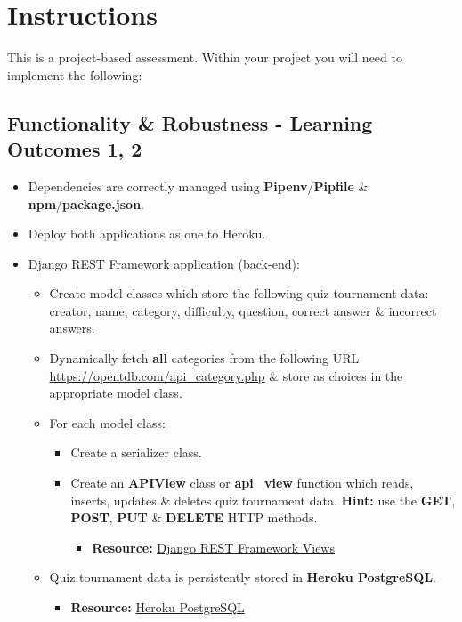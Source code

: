 \documentclass{article}
\begin{document}
\newpage

\section*{Instructions} 
This is a project-based assessment. Within your project you will need to implement the following:

\subsection*{Functionality \& Robustness - Learning Outcomes 1, 2}
\begin{itemize}
	\item Dependencies are correctly managed using \textbf{Pipenv}/\textbf{Pipfile} \& \textbf{npm}/\textbf{package.json}.
	\item Deploy both applications as one to Heroku.
	\item Django REST Framework application (back-end):
	\begin{itemize}
		\item Create model classes which store the following quiz tournament data: creator, name, category, difficulty, question, correct answer \& incorrect answers. 
		\item Dynamically fetch \textbf{all} categories from the following URL \href{https://opentdb.com/api\_category.php}{https://opentdb.com/api\_category.php} \& store as choices in the appropriate model class.
		\item For each model class:
		\begin{itemize}
			\item Create a serializer class. 
			\item Create an \textbf{APIView} class or \textbf{api\_view} function which reads, inserts, updates \& deletes quiz tournament data. \textbf{Hint:} use the \textbf{GET}, \textbf{POST}, \textbf{PUT} \& \textbf{DELETE} HTTP methods.
			\begin{itemize}
				\item \textbf{Resource:} \href{https://www.django-rest-framework.org/api-guide/views}{Django REST Framework Views}
			\end{itemize}
		\end{itemize} 
		\item Quiz tournament data is persistently stored in \textbf{Heroku PostgreSQL}.
		\begin{itemize}
			\item \textbf{Resource:} \href{https://www.heroku.com/postgres}{Heroku PostgreSQL}

\end{itemize}
\end{itemize}
\end{itemize}
\end{document}
